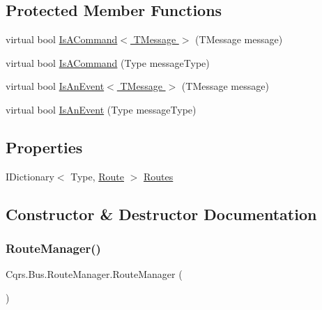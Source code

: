\subsection*{Protected Member Functions}
\begin{DoxyCompactItemize}
\item 
virtual bool \hyperlink{classCqrs_1_1Bus_1_1RouteManager_a1ee8d583bb5d75a54cdac03c8e84b8d9_a1ee8d583bb5d75a54cdac03c8e84b8d9}{Is\+A\+Command$<$ T\+Message $>$} (T\+Message message)
\item 
virtual bool \hyperlink{classCqrs_1_1Bus_1_1RouteManager_a7b7bfc4db30cc5956c4acd6a342e9159_a7b7bfc4db30cc5956c4acd6a342e9159}{Is\+A\+Command} (Type message\+Type)
\item 
virtual bool \hyperlink{classCqrs_1_1Bus_1_1RouteManager_a7e5099741cd4b3e538599c771581a4b6_a7e5099741cd4b3e538599c771581a4b6}{Is\+An\+Event$<$ T\+Message $>$} (T\+Message message)
\item 
virtual bool \hyperlink{classCqrs_1_1Bus_1_1RouteManager_a7b9b2ad8b9f5d7761b0f45c033b96101_a7b9b2ad8b9f5d7761b0f45c033b96101}{Is\+An\+Event} (Type message\+Type)
\end{DoxyCompactItemize}
\subsection*{Properties}
\begin{DoxyCompactItemize}
\item 
I\+Dictionary$<$ Type, \hyperlink{classCqrs_1_1Bus_1_1Route}{Route} $>$ \hyperlink{classCqrs_1_1Bus_1_1RouteManager_ad6a3c8e41e10f62d075e52d08d817cee_ad6a3c8e41e10f62d075e52d08d817cee}{Routes}
\end{DoxyCompactItemize}


\subsection{Constructor \& Destructor Documentation}
\mbox{\label{classCqrs_1_1Bus_1_1RouteManager_abcc8a62319ac7a6edd38ed2d26ef5234_abcc8a62319ac7a6edd38ed2d26ef5234}} 
\subsubsection{\texorpdfstring{Route\+Manager()}{RouteManager()}}
{\footnotesize\ttfamily Cqrs.\+Bus.\+Route\+Manager.\+Route\+Manager (\begin{DoxyParamCaption}{ }\end{DoxyParamCaption})}



